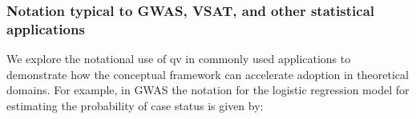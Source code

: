 \subsubsection{Notation typical to GWAS, VSAT, and other statistical applications}
We explore the notational use of \ac{qv} in commonly used applications to demonstrate how the conceptual framework can accelerate adoption in theoretical domains. 
For example, in GWAS \cite{uffelmann2021genome} the notation for the logistic regression model for estimating the probability of case status is given by:
%
%


